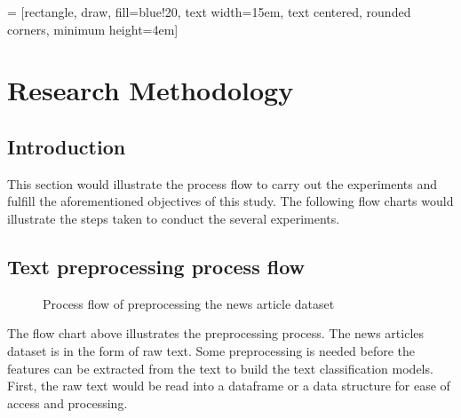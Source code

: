 
 = [rectangle, draw, fill=blue!20, 
text width=15em, text centered, rounded corners, minimum height=4em]


\chapter{Research Methodology}
\section{Introduction}
This section would illustrate the process flow to carry out the experiments and fulfill the aforementioned objectives of this study. The following flow charts would illustrate the steps taken to conduct the several experiments.\\

\section{Text preprocessing process flow}
\begin{figure} [ht]
\centering
{}
\caption{Process flow of preprocessing the news article dataset}
\label{fig: preprocessFlow}
\end{figure}

The flow chart above illustrates the preprocessing process. The news articles dataset is in the form of raw text. Some preprocessing is needed before the features can be extracted from the text to build the text classification models. First, the raw text would be read into a dataframe or a data structure for ease of access and processing.

